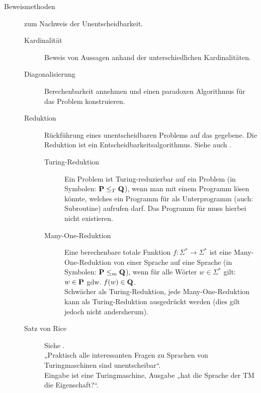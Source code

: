 \begin{description}
        \item[Beweismethoden] zum Nachweis der Unentscheidbarkeit.
        \begin{description}
            \item[Kardinalität] Beweis von Aussagen anhand der unterschiedlichen Kardinalitäten.
            \item[Diagonalisierung] Berechenbarkeit annehmen und einen paradoxen Algorithmus für das Problem konstruieren.
            \item[Reduktion] Rückführung eines unentscheidbaren Problems auf das gegebene. Die Reduktion ist ein Entscheid\-bar\-keits\-algorithmus. Siehe auch . 
                \begin{description}
                    \item[Turing-Reduktion] Ein Problem  ist Turing-reduzierbar auf ein Problem  (in Symbolen: $\textbf{P} \leq_T\textbf{Q}$), wenn man  mit einem Programm lösen könnte, welches ein Programm für  als Unterprogramm (auch: Subroutine) aufrufen darf. Das Programm für  muss hierbei nicht existieren.
                    \item[Many-One-Reduktion] Eine berechenbare totale Funktion $f: \Sigma^* \to \Sigma^*$ ist eine Many-One-Reduktion von einer Sprache  auf eine Sprache  (in Symbolen: $\textbf{P} \leq_m \textbf{Q}$), wenn für alle Wörter $w \in \Sigma^*$ gilt: $w \in \textbf{P}$ gdw. $f(w) \in \textbf{Q}$. \\
                    Schwächer als Turing-Reduktion, jede Many-One-Reduktion kann als Turing-Reduktion ausgedrückt werden (dies gilt jedoch nicht andersherum).
                \end{description}
            \item[Satz von Rice] Siehe .  \\
                „Praktisch alle interessanten Fragen zu Sprachen von Turingmaschinen sind unentscheibar“. \\
                Eingabe ist eine Turingmaschine, Ausgabe „hat die Sprache der TM die Eigenschaft?“.
        \end{description}
    \end{description}


